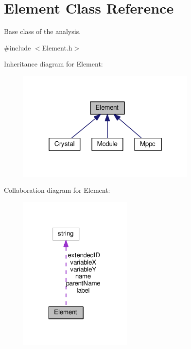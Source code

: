 \hypertarget{classElement}{\section{Element Class Reference}
\label{classElement}
}


Base class of the analysis.  




{\ttfamily \#include $<$Element.\+h$>$}



Inheritance diagram for Element\+:\nopagebreak
\begin{figure}[H]
\begin{center}
\leavevmode
\includegraphics[width=253pt]{classElement__inherit__graph}
\end{center}
\end{figure}


Collaboration diagram for Element\+:\nopagebreak
\begin{figure}[H]
\begin{center}
\leavevmode
\includegraphics[width=160pt]{classElement__coll__graph}
\end{center}
\end{figure}
